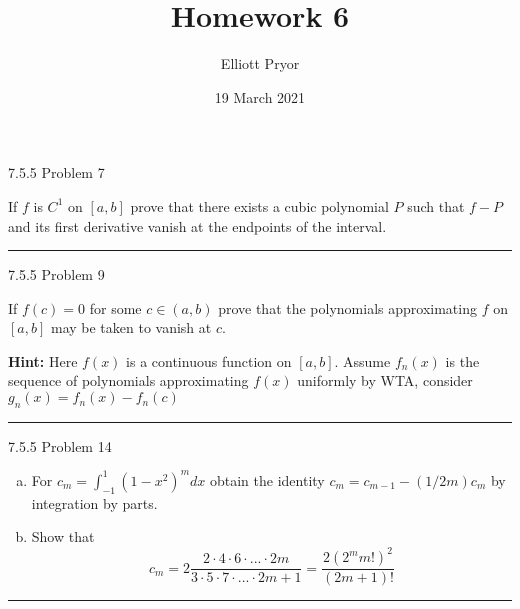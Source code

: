 \documentclass[11pt]{article}
\title{Homework 6}
\author{Elliott Pryor}
\date{19 March 2021}
\begin{document}
\maketitle

 7.5.5 Problem 7

If $f$ is $C^1$ on $[a,b]$ prove that there exists a cubic polynomial $P$
such that $f- P$ and its first derivative vanish at the endpoints of the interval.

\hrule





 7.5.5 Problem 9 

If $f(c) = 0$ for some $c \in (a,b)$ prove that the polynomials approximating $f$ on 
$[a,b]$ may be taken to vanish at $c$.

\textbf{Hint: } Here $f(x)$ is a continuous function on $[a,b]$.
Assume $f_n(x)$ is the sequence of polynomials approximating $f(x)$ uniformly by WTA,
consider $g_n(x) = f_n(x) - f_n(c)$

\hrule





 7.5.5 Problem 14

\begin{enumerate}[(a)]
    \item For $c_m = \int_{-1} ^1 (1-x^2)^m dx$ obtain the identity $c_m = c_{m-1} - (1/2m)c_m$ 
    by integration by parts.
    \item Show that 
    $$c_m = 2 \frac{2 \cdot 4 \cdot 6 \cdot ... \cdot 2m}{3 \cdot 5 \cdot 7 \cdot ... \cdot 2m +1} = \frac{2(2^mm!)^2}{(2m +1)!}$$
    
\end{enumerate}

\hrule
\end{document}
